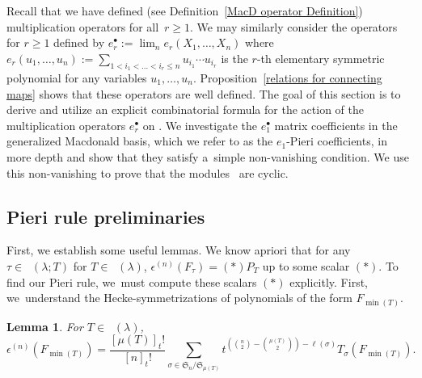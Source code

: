 \documentclass[pdftex]{sigma}
\numberwithin{equation}{section}
\newtheorem{Lemma}[Theorem]{Lemma}
\theoremstyle{definition}
\DeclareMathOperator{\RYT}{\mathrm{RYT}_{\geq 0}}
\DeclareMathOperator{\PSYT}{\mathrm{PSYT}_{\geq 0}}
\DeclareMathOperator{\RSSYT}{\mathrm{RSSYT}_{\geq 0}}
\DeclareMathOperator{\Min}{\mathrm{min}}
\begin{document}
Recall that we have defined (see Definition~\ref{MacD operator Definition}) multiplication operators  for all~${r\geq 1}$. We may similarly consider the operators  for $r\geq 1$ defined by $e_r^{\bullet} := \lim_{n} e_r(X_1,\dots,X_n) $ where $e_r(u_1,\dots,u_n):=\sum_{1<i_1<\dots< i_r \leq n} u_{i_1}\cdots u_{i_r}$ is the $r$-th elementary symmetric polynomial for any variables $u_1,\dots,u_n$.
 Proposition~\ref{relations for connecting maps} shows that these operators are well defined. The goal of this section is to derive and utilize an explicit combinatorial formula for the action of the multiplication operators $e_r^{\bullet}$ on . We investigate the $e_1^{\bullet}$ matrix coefficients in the generalized Macdonald basis, which we refer to as the $e_1$-Pieri coefficients, in more depth and show that they satisfy a~simple non-vanishing condition. We use this non-vanishing to prove that the modules~ are cyclic.

\subsection{Pieri rule preliminaries}

First, we establish some useful lemmas.
 We know apriori that for any $\tau \in \PSYT(\lambda;\allowbreak T)$ for $T \in \RSSYT(\lambda)$, $\epsilon^{(n)}(F_{\tau})= (*)P_{T}$ up to some scalar $(*)$. To find our Pieri rule, we~must compute these scalars $(*)$ explicitly. First, we~understand the Hecke-symmetrizations of polynomials of the form $F_{\Min(T)}$.

\begin{Lemma}\label{sym of min term}
 For $T \in \RYT(\lambda)$,
 \[
 \epsilon^{(n)}(F_{\Min(T)}) = \frac{[\mu(T)]_{t}!}{[n]_{t}!} \sum_{\sigma \in \mathfrak{S}_n/\mathfrak{S}_{\mu(T)}} t^{ ({n \choose 2} - {\mu(T) \choose 2}) - \ell(\sigma)}T_{\sigma}(F_{\Min(T)}).
 \]

\end{Lemma}
\end{document}
